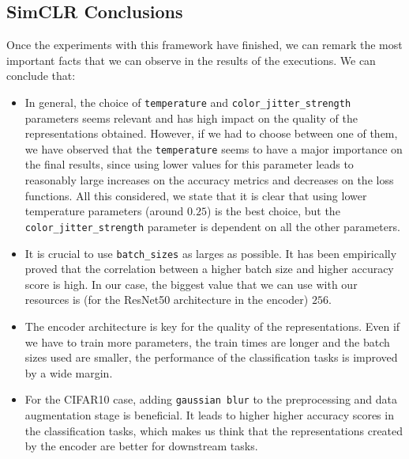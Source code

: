 \subsection{SimCLR Conclusions}

Once the experiments with this framework have finished, we can remark the most important facts that we can observe in the results of the executions. We can conclude that:
\begin{itemize}
\item In general, the choice of \lstinline{temperature} and \lstinline{color_jitter_strength} parameters seems relevant and has high impact on the quality of the representations obtained. However, if we had to choose between one of them, we have observed that the \lstinline{temperature}  seems to have a major importance on the final results, since using lower values for this parameter leads to reasonably large increases on the accuracy metrics and decreases on the loss functions. All this considered, we  state that it is clear that using lower temperature parameters (around $0.25$) is the best choice, but the \lstinline{color_jitter_strength} parameter is dependent on all the other parameters.

\item It is crucial to use \lstinline{batch_sizes} as larges as possible. It has been empirically proved that the correlation between a higher batch size and higher accuracy score is high. In our case, the biggest value that we can use with our resources is (for the ResNet50 architecture in the encoder) $256$.

\item The encoder architecture is key for the quality of the representations. Even if we have to train more parameters,  the train times are longer and the batch sizes used are smaller, the performance of the classification tasks is improved by a wide margin.

\item For the CIFAR10 case, adding \lstinline{gaussian blur} to the preprocessing and data augmentation stage is beneficial. It leads to higher higher accuracy scores in the classification tasks, which makes us think that the representations created by the encoder are better for downstream tasks.
\end{itemize}


\begin{table}[H]
    \caption{Conclusion results in SimCLR.}
    \label{table:conclusion:simclr}
\end{table}


